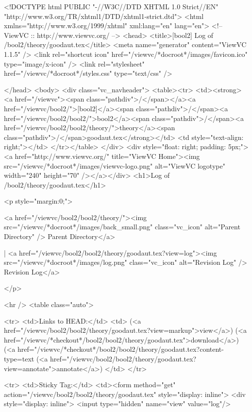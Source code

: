 



<!DOCTYPE html PUBLIC "-//W3C//DTD XHTML 1.0 Strict//EN"
"http://www.w3.org/TR/xhtml1/DTD/xhtml1-strict.dtd">
<html xmlns="http://www.w3.org/1999/xhtml" xml:lang="en" lang="en">
<!-- ViewVC :: http://www.viewvc.org/ -->
<head>
<title>[bool2] Log of /bool2/theory/goodaut.tex</title>
<meta name="generator" content="ViewVC 1.1.5" />
<link rel="shortcut icon" href="/viewvc/*docroot*/images/favicon.ico" type="image/x-icon" />
<link rel="stylesheet" href="/viewvc/*docroot*/styles.css" type="text/css" />

</head>
<body>
<div class="vc_navheader">
<table><tr>
<td><strong><a href="/viewvc"><span class="pathdiv">/</span></a><a href="/viewvc/bool2/">[bool2]</a><span class="pathdiv">/</span><a href="/viewvc/bool2/bool2/">bool2</a><span class="pathdiv">/</span><a href="/viewvc/bool2/bool2/theory/">theory</a><span class="pathdiv">/</span>goodaut.tex</strong></td>
<td style="text-align: right;"></td>
</tr></table>
</div>
<div style="float: right; padding: 5px;"><a href="http://www.viewvc.org/" title="ViewVC Home"><img src="/viewvc/*docroot*/images/viewvc-logo.png" alt="ViewVC logotype" width="240" height="70" /></a></div>
<h1>Log of /bool2/theory/goodaut.tex</h1>

<p style="margin:0;">

<a href="/viewvc/bool2/bool2/theory/"><img src="/viewvc/*docroot*/images/back_small.png" class="vc_icon" alt="Parent Directory" /> Parent Directory</a>

| <a href="/viewvc/bool2/bool2/theory/goodaut.tex?view=log"><img src="/viewvc/*docroot*/images/log.png" class="vc_icon" alt="Revision Log" /> Revision Log</a>




</p>

<hr />
<table class="auto">



<tr>
<td>Links to HEAD:</td>
<td>
(<a href="/viewvc/bool2/bool2/theory/goodaut.tex?view=markup">view</a>)
(<a href="/viewvc/*checkout*/bool2/bool2/theory/goodaut.tex">download</a>)
(<a href="/viewvc/*checkout*/bool2/bool2/theory/goodaut.tex?content-type=text%
(<a href="/viewvc/bool2/bool2/theory/goodaut.tex?view=annotate">annotate</a>)
</td>
</tr>



<tr>
<td>Sticky Tag:</td>
<td><form method="get" action="/viewvc/bool2/bool2/theory/goodaut.tex" style="display: inline">
<div style="display: inline">
<input type="hidden" name="view" value="log"/>


